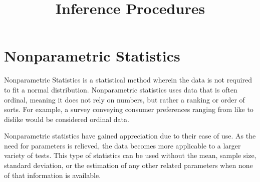 \documentclass[12pt]{article}
\title{Inference Procedures}
\begin{document}
\section*{Nonparametric Statistics}

Nonparametric Statistics is a statistical method wherein the data is not required to fit a normal distribution. Nonparametric statistics uses data that is often ordinal, meaning it does not rely on numbers, but rather a ranking or order of sorts. For example, a survey conveying consumer preferences ranging from like to dislike would be considered ordinal data.

Nonparametric statistics have gained appreciation due to their ease of use. As the need for parameters is relieved, the data becomes more applicable to a larger variety of tests. This type of statistics can be used without the mean, sample size, standard deviation, or the estimation of any other related parameters when none 
of that information is available.
\end{document}
